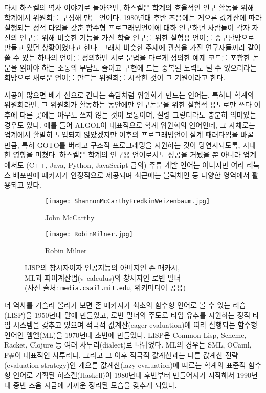 다시 하스켈의 역사\cite{Hudak2007HistoryHaskell} 이야기로 돌아오면,
하스켈은 학계의 효율적인 연구 활동을 위해 학계에서 위원회를 구성해 만든 언어다.
1980년대 후반 즈음에는 게으른 값계산에 따라 실행되는 정적 타입을 갖춘
함수형 프로그래밍언어에 대하 연구하던 사람들이 각자 자신의 연구를 위해
비슷한 기능을 가진 학술 연구를 위한 실험용 언어를 중구난방으로 만들고
있던 상황이었다고 한다. 그래서 비슷한 주제에 관심을 가진 연구자들끼리
같이 쓸 수 있는 하나의 언어를 정의하면 서로 문법을 다르게 정의한 예제
코드를 포함한 논문을 읽어야 하는 소통의 부담도 줄이고 구현에 드는 중복된
노력도 덜 수 있으리라는 희망으로 새로운 언어를 만드는 위원회를 시작한 것이
그 기원이라고 한다.

사공이 많으면 배가 산으로 간다는 속담처럼 위원회가 만드는 언어는,
특히나 학계의 위원회라면, 그 위원회가 활동하는 동안에만 연구논문을
위한 실험적 용도로만 쓰다 이후에 다른 곳에는 아무도 쓰지 않는 것이 보통이며,
설령 그렇더라도 충분히 의미있는 경우도 있다. 예를 들어 ALGOL이 대표적으로
학계 위원회의 언어인데, 그 자체로는 업계에서 활발히 도입되지 않았겠지만
이후의 프로그래밍언어 설계 패러다임을 바꿀 만큼, 특히 GOTO를 버리고
구조적 프로그래밍을 지원하는 것이 당연시되도록, 지대한 영향을 미쳤다.
하스켈은 학계의 연구용 언어로서도 성공을 거뒀을 뿐 아니라 업계에서도
(C++, Java, Python, JavaScript 급의) 주류 개발 언어는 아니지만 여러
리눅스 배포판에 패키지가 안정적으로 제공되며 최근에는
블럭체인\cite{Seijas2020Marlowe} 등 다양한 영역에서 활용되고 있다.

\begin{figure}\centering
\begin{subfigure}{.3\textwidth}\centering
\texttt{[image: ShannonMcCarthyFredkinWeizenbaum.jpg]}
\caption{John McCarthy}
\end{subfigure}
\qquad\qquad
\begin{subfigure}{.3\textwidth}\centering
\texttt{[image: RobinMilner.jpg]}
\caption{Robin Milner}
\end{subfigure}
\caption{LISP의 창시자이자 인공지능의 아버지인 존 매카시,\\
         ML과 파이계산법($\pi$-calculus)의 창사자인 로빈 밀너\\
         {\footnotesize(사진 출처: \texttt{media.csail.mit.edu},
                        위키미디어 공용)}
	 \label{fig:McCarthyMilner} }
\end{figure}

더 역사를 거슬러 올라가 보면 존 매카시가 최초의 함수형 언어로 볼 수 있는
리습(LISP)을 1950년대 말에 만들었고, 로빈 밀너의 주도로 타입 유추를
지원하는 정적 타입 시스템을 갖추고 있으며 적극적 값계산(eager evaluation)에
따라 실행되는 함수형 언어인 엠엘(ML)을 1970년대 초반에 만들었다.
LISP은 Common Lisp, Scheme, Racket, Clojure 등 여러 사투리(dialect)로 나뉘었다.
ML의 경우는 SML, OCaml, F\#이 대표적인 사투리다. 그리고 그 이후
적극적 값계산과는 다른 값계산 전략(evaluation strategy)인
게으른 값계산(lazy evaluation)에 따르는 학계의 표준적 함수형 언어로 기획된
하스켈(Haskell)이 1980년대 후반부터 만들어지기 시작해서 1990년대 중반 즈음 
지금에 가까운 정리된 모습을 갖추게 되었다\cite{Hudak2007HistoryHaskell}.

